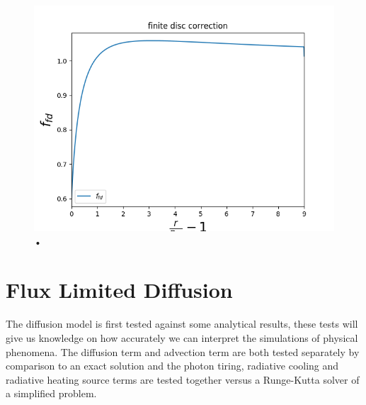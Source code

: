 \begin{figure}
\centering
\includegraphics[width = \textwidth]{CAK_fd_factor.png}
\caption{•}
\label{fig: fd_factor}
\end{figure}


\section{Flux Limited Diffusion}
The diffusion model is first tested against some analytical results, these tests will give us knowledge on how accurately we can interpret the simulations of physical phenomena. The diffusion term and advection term are both tested separately by comparison to an exact solution and the photon tiring, radiative cooling and radiative heating source terms are tested together versus a Runge-Kutta solver of a simplified problem.

